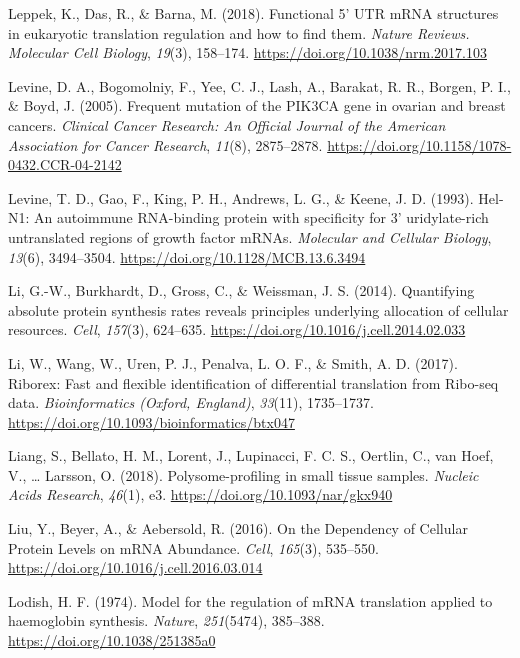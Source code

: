 \documentclass[12pt,openany]{book}
\begin{document}
\hypertarget{ref-Leppek2018}{}
Leppek, K., Das, R., \& Barna, M. (2018). Functional 5' UTR mRNA
structures in eukaryotic translation regulation and how to find them.
\emph{Nature Reviews. Molecular Cell Biology}, \emph{19}(3), 158--174.
\url{https://doi.org/10.1038/nrm.2017.103}

\hypertarget{ref-Levine2005}{}
Levine, D. A., Bogomolniy, F., Yee, C. J., Lash, A., Barakat, R. R.,
Borgen, P. I., \& Boyd, J. (2005). Frequent mutation of the PIK3CA gene
in ovarian and breast cancers. \emph{Clinical Cancer Research: An
Official Journal of the American Association for Cancer Research},
\emph{11}(8), 2875--2878.
\url{https://doi.org/10.1158/1078-0432.CCR-04-2142}

\hypertarget{ref-Levine1993}{}
Levine, T. D., Gao, F., King, P. H., Andrews, L. G., \& Keene, J. D.
(1993). Hel-N1: An autoimmune RNA-binding protein with specificity for
3' uridylate-rich untranslated regions of growth factor mRNAs.
\emph{Molecular and Cellular Biology}, \emph{13}(6), 3494--3504.
\url{https://doi.org/10.1128/MCB.13.6.3494}

\hypertarget{ref-Li2014}{}
Li, G.-W., Burkhardt, D., Gross, C., \& Weissman, J. S. (2014).
Quantifying absolute protein synthesis rates reveals principles
underlying allocation of cellular resources. \emph{Cell}, \emph{157}(3),
624--635. \url{https://doi.org/10.1016/j.cell.2014.02.033}

\hypertarget{ref-Li2017}{}
Li, W., Wang, W., Uren, P. J., Penalva, L. O. F., \& Smith, A. D.
(2017). Riborex: Fast and flexible identification of differential
translation from Ribo-seq data. \emph{Bioinformatics (Oxford, England)},
\emph{33}(11), 1735--1737.
\url{https://doi.org/10.1093/bioinformatics/btx047}

\hypertarget{ref-Liang2018}{}
Liang, S., Bellato, H. M., Lorent, J., Lupinacci, F. C. S., Oertlin, C.,
van Hoef, V., \ldots{} Larsson, O. (2018). Polysome-profiling in small
tissue samples. \emph{Nucleic Acids Research}, \emph{46}(1), e3.
\url{https://doi.org/10.1093/nar/gkx940}

\hypertarget{ref-Liu2016}{}
Liu, Y., Beyer, A., \& Aebersold, R. (2016). On the Dependency of
Cellular Protein Levels on mRNA Abundance. \emph{Cell}, \emph{165}(3),
535--550. \url{https://doi.org/10.1016/j.cell.2016.03.014}

\hypertarget{ref-Lodish1974}{}
Lodish, H. F. (1974). Model for the regulation of mRNA translation
applied to haemoglobin synthesis. \emph{Nature}, \emph{251}(5474),
385--388. \url{https://doi.org/10.1038/251385a0}
\end{document}
